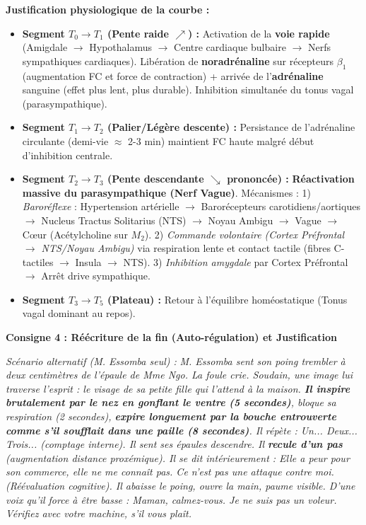 \documentclass[11pt]{article}
\begin{document}
\begin{exoresolu}
\textbf{Justification physiologique de la courbe :}
\begin{itemize}
    \item \textbf{Segment $T_0 \rightarrow T_1$ (Pente raide $\nearrow$) :} Activation de la \textbf{voie rapide} (Amigdale $\rightarrow$ Hypothalamus $\rightarrow$ Centre cardiaque bulbaire $\rightarrow$ Nerfs sympathiques cardiaques). Libération de \textbf{noradrénaline} sur récepteurs $\beta_1$ (augmentation FC et force de contraction) + arrivée de l'\textbf{adrénaline} sanguine (effet plus lent, plus durable). Inhibition simultanée du tonus vagal (parasympathique).
    \item \textbf{Segment $T_1 \rightarrow T_2$ (Palier/Légère descente) :} Persistance de l'adrénaline circulante (demi-vie $\approx$ 2-3 min) maintient FC haute malgré début d'inhibition centrale.
    \item \textbf{Segment $T_2 \rightarrow T_3$ (Pente descendante $\searrow$ prononcée) :} \textbf{Réactivation massive du parasympathique (Nerf Vague)}. Mécanismes : 1) \emph{Baroréflexe} : Hypertension artérielle $\rightarrow$ Barorécepteurs carotidiens/aortiques $\rightarrow$ Nucleus Tractus Solitarius (NTS) $\rightarrow$ Noyau Ambigu $\rightarrow$ Vague $\rightarrow$ Cœur (Acétylcholine sur $M_2$). 2) \emph{Commande volontaire (Cortex Préfrontal $\rightarrow$ NTS/Noyau Ambigu)} via respiration lente et contact tactile (fibres C-tactiles $\rightarrow$ Insula $\rightarrow$ NTS). 3) \emph{Inhibition amygdale} par Cortex Préfrontal $\rightarrow$ Arrêt drive sympathique.
    \item \textbf{Segment $T_3 \rightarrow T_5$ (Plateau) :} Retour à l'équilibre homéostatique (Tonus vagal dominant au repos).
\end{itemize}

\textbf{Consigne 4 : Réécriture de la fin (Auto-régulation) et Justification}

\emph{Scénario alternatif (M. Essomba seul) :}
\og \textit{M. Essomba sent son poing trembler à deux centimètres de l'épaule de Mme Ngo. La foule crie. Soudain, une image lui traverse l'esprit : le visage de sa petite fille qui l'attend à la maison. \textbf{Il inspire brutalement par le nez en gonflant le ventre (5 secondes)}, bloque sa respiration (2 secondes), \textbf{expire longuement par la bouche entrouverte comme s'il soufflait dans une paille (8 secondes)}. Il répète : \og Un... Deux... Trois... \fg (comptage interne). Il sent ses épaules descendre. Il \textbf{recule d'un pas} (augmentation distance proxémique). Il se dit intérieurement : \og Elle a peur pour son commerce, elle ne me connaît pas. Ce n'est pas une attaque contre moi. \fg (Réévaluation cognitive). Il abaisse le poing, ouvre la main, paume visible. D'une voix qu'il force à être basse : \og Maman, calmez-vous. Je ne suis pas un voleur. Vérifiez avec votre machine, s'il vous plaît. \fg} \fg


\end{exoresolu}
\end{document}
